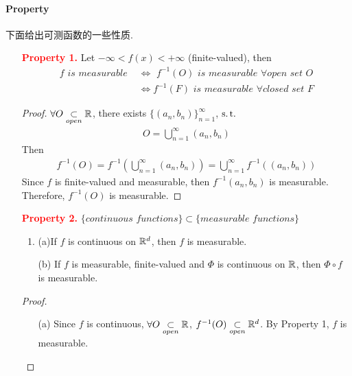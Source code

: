 \paragraph{Property}
	下面给出可测函数的一些性质.
	\begin{enumerate}
		\item[\textcolor{red}{\textbf{Property 1.}}]Let $-\infty < f(x) < +\infty$ (finite-valued), then
		\begin{align}
			f \,\, is \,\, measurable \,\, &\Leftrightarrow \,\, f^{-1}(O) \,\, is \,\, measurable \,\, \forall open \,\, set \,\, O \\
			&\Leftrightarrow f^{-1}(F) \,\, is \,\, measurable \,\, \forall closed \,\, set \,\, F
		\end{align}
	
		\vspace{2em}
		\begin{proof}
			$\forall O \underset{open}{\subset} \mathbb{R}$, there exists $\{ (a_n , b_n) \}_{n = 1}^{\infty}$, $\operatorname{s.t.}$
			\begin{align}
				O = \bigcup_{n = 1}^{\infty}{(a_n , b_n)}
			\end{align}
			Then
			\begin{align}
				f^{-1}(O) = f^{-1}(\bigcup_{n = 1}^{\infty}{(a_n , b_n)}) = \bigcup_{n = 1}^{\infty}{f^{-1}((a_n , b_n))}
			\end{align}
			Since $f$ is finite-valued and measurable, then $f^{-1}(a_n , b_n)$ is measurable.\\
			Therefore, $f^{-1}(O)$ is measurable.
		\end{proof}
		
		\vspace{2em}
		\item[\textcolor{red}{\textbf{Property 2.}}]$\{ continuous \,\, functions \} \subset \{ measurable \,\, functions \}$
		\begin{enumerate}
			\item{(a)}If $f$ is continuous on $\mathbb{R}^d$, then $f$ is measurable.
			
			\item[(b)]If $f$ is measurable, finite-valued and $\Phi$ is continuous on $\mathbb{R}$, then $\Phi \circ f$ is measurable.
		\end{enumerate}
	
		\vspace{2em}
		\begin{proof}
			\begin{enumerate}
				\item[(a)]Since $f$ is continuous, $\forall O \underset{open}{\subset} \mathbb{R}$, $f^{-1}(O) \underset{open}{\subset} \mathbb{R}^d$. By Property 1, $f$ is measurable.
				

\end{enumerate}
\end{proof}
\end{enumerate}
